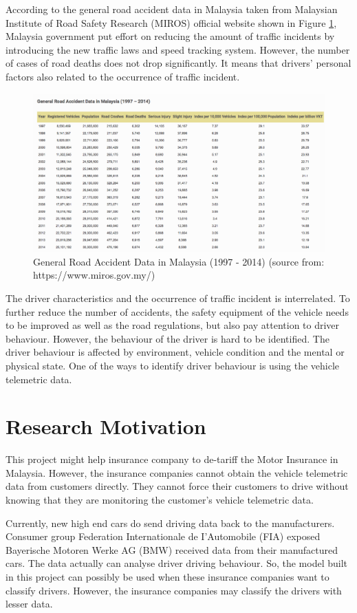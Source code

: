 According to the general road accident data in Malaysia taken from Malaysian Institute of Road Safety Research (MIROS) official website shown in Figure \ref{fig:accident}, Malaysia government put effort on reducing the amount of traffic incidents by introducing the new traffic laws and speed tracking system. However, the number of cases of road deaths does not drop significantly. It means that drivers' personal factors also related to the occurrence of traffic incident.

\begin{figure}[hbt!]\centering
\includegraphics[width=.75\textwidth]{image/accident}
\caption{General Road Accident Data in Malaysia (1997 - 2014) (source from: https://www.miros.gov.my/)}
\label{fig:accident}
\end{figure}

The driver characteristics and the occurrence of traffic incident is interrelated. To further reduce the number of accidents, the safety equipment of the vehicle needs to be improved as well as the road regulations, but also pay attention to driver behaviour. However, the behaviour of the driver is hard to be identified. The driver behaviour is affected by environment, vehicle condition and the mental or physical state.\cite{miyaji:danno:oguri:2008} One of the ways to identify driver behaviour is using the vehicle telemetric data.

\section{Research Motivation}
This project might help insurance company to de-tariff the Motor Insurance in Malaysia. However, the insurance companies cannot obtain the vehicle telemetric data from customers directly. They cannot force their customers to drive without knowing that they are monitoring the customer's vehicle telemetric data.

Currently, new high end cars do send driving data back to the manufacturers. Consumer group Federation Internationale de I'Automobile (FIA) exposed Bayerische Motoren Werke AG (BMW) received data from their manufactured cars. The data actually can analyse driver driving behaviour.\cite{catherine:2015} So, the model built in this project can possibly be used when these insurance companies want to classify drivers. However, the insurance companies may classify the drivers with lesser data.

